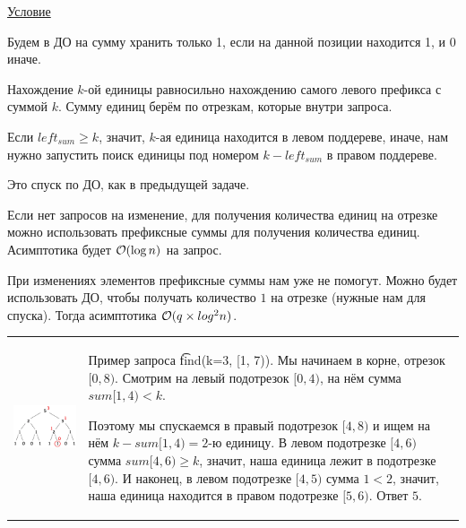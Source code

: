  \href{https://codeforces.com/edu/course/2/lesson/4/2/practice/contest/273278/problem/B}{Условие}

Будем в ДО на сумму хранить только 1, если на данной позиции находится 1, и 0 иначе.
\down

Нахождение $k$-ой единицы равносильно нахождению самого левого префикса с суммой $k$. Сумму единиц берём по отрезкам, которые внутри запроса.

Если $left_{sum} \ge k$, значит, $k$-ая единица находится в левом поддереве, иначе, нам нужно запустить поиск единицы под номером $k - left_{sum}$ в правом поддереве.

Это спуск по ДО, как в предыдущей задаче.

\down

Если нет запросов на изменение, для получения количества единиц на отрезке можно использовать префиксные суммы для получения количества единиц. 
Асимптотика будет $ \mathcal{O}(\log n)$ на запрос.

При изменениях элементов префиксные суммы нам уже не помогут. Можно будет использовать ДО, чтобы получать количество $1$ на отрезке (нужные нам для спуска). Тогда асимптотика $ \mathcal{O}(q \times log^2 n)$. 

\begin{tabular}{cm{}}
	\begin{minipage}{4cm}
		\includegraphics[scale=0.5]{files/k-th.png}
	\end{minipage} 
	&
	Пример запроса \t{find(k=3, [1, 7))}. Мы начинаем в корне, отрезок $[0,8)$. Смотрим на левый подотрезок $[0, 4)$, на нём сумма $sum [1,4) < k$. 
	
	Поэтому мы спускаемся в правый подотрезок $[4,8)$ и ищем на нём $k-sum [1, 4) = 2$-ю единицу. В левом подотрезке $[4,6)$ сумма $sum [4, 6) \ge k$, значит, наша единица лежит в подотрезке $[4,6)$. И наконец, в левом подотрезке $[4,5)$ сумма $1 < 2$, значит, наша единица находится в правом подотрезке $[5,6)$. Ответ $5$.
\end{tabular}


